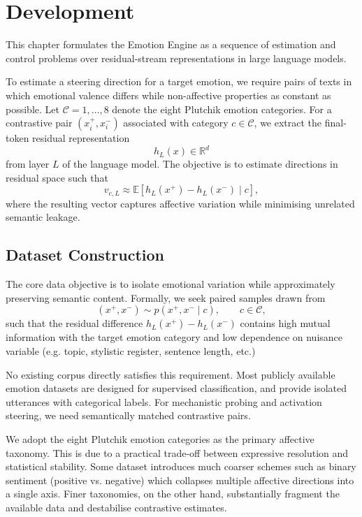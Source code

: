 \documentclass[12pt,twoside]{report}
\begin{document}
\chapter{Development}

This chapter formulates the Emotion Engine as a sequence of estimation and control problems over residual-stream representations in large language models.

To estimate a steering direction for a target emotion, we require pairs of texts in which emotional valence differs while non-affective properties as constant as possible. Let $\mathcal{C}={1,\dots,8}$ denote the eight Plutchik emotion categories. For a contrastive pair $(x_i^+,x_i^-)$ associated with category $c \in \mathcal{C}$, we extract the final-token residual representation
\begin{equation}
h_L(x)\in\mathbb{R}^d
\end{equation}
from layer $L$ of the language model. The objective is to estimate directions in residual space such that
\begin{equation}
v_{c,L} \approx \mathbb{E}[h_L(x^+) - h_L(x^-)\mid c],
\label{eq}
\end{equation}
where the resulting vector captures affective variation while minimising unrelated semantic leakage.

\section{Dataset Construction}

The core data objective is to isolate emotional variation while approximately preserving semantic content. Formally, we seek paired samples drawn from
\begin{equation}
(x^+,x^-) \sim p(x^+,x^- \mid c), \qquad c \in \mathcal{C},
\end{equation}
such that the residual difference $h_L(x^+) - h_L(x^-)$ contains high mutual information with the target emotion category and low dependence on nuisance variable (e.g. topic, stylistic register, sentence length, etc.)

No existing corpus directly satisfies this requirement. Most publicly available emotion datasets are designed for supervised classification, and provide isolated utterances with categorical labels. For mechanistic probing and activation steering, we need semantically matched contrastive pairs.

We adopt the eight Plutchik emotion categories as the primary affective taxonomy. This is due to a practical trade-off between expressive resolution and statistical stability. Some dataset introduces much coarser schemes such as binary sentiment (positive vs. negative) which collapses multiple affective directions into a single axis. Finer taxonomies, on the other hand, substantially fragment the available data and destabilise contrastive estimates.  
\end{document}
